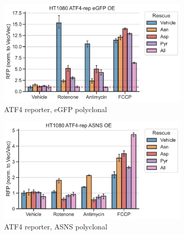 \begin{figure}
     \centering
     \hspace{0.25\textwidth}
     \begin{subfigure}[b]{0.5\textwidth}
         \centering
         \includegraphics[width=\textwidth]{figures/sapp/ISR/HT1080_ATF4rep_eGFP_OE.pdf}
         \caption{ATF4 reporter, eGFP polyclonal}
         \label{fig:sapp:ISR:HT1080_ATF4rep_eGFP_OE}
     \end{subfigure}
     \hfill
     \hspace{0.25\textwidth}
     \begin{subfigure}[b]{0.5\textwidth}
         \centering
         \includegraphics[width=\textwidth]{figures/sapp/ISR/HT1080_ATF4rep_ASNS_OE.pdf}
         \caption{ATF4 reporter, ASNS polyclonal}
         \label{fig:sapp:ISR:HT1080_ATF4rep_ASNS_OE}
     \end{subfigure}
     \hfill
     \hspace{0.2\textwidth}
     \begin{subfigure}[b]{0.6\textwidth}
         \centering

\end{subfigure}
\end{figure}
